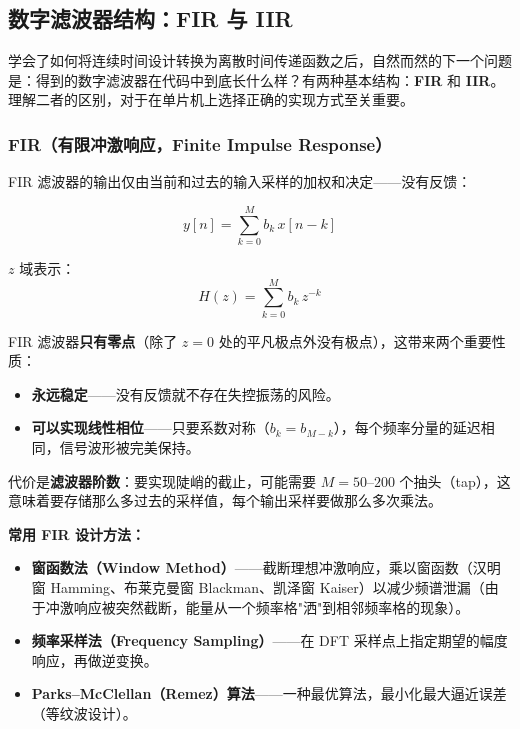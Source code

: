 \subsection{数字滤波器结构：FIR 与 IIR}

学会了如何将连续时间设计转换为离散时间传递函数之后，自然而然的下一个问题是：得到的数字滤波器在代码中到底长什么样？有两种基本结构：\textbf{FIR} 和 \textbf{IIR}。理解二者的区别，对于在单片机上选择正确的实现方式至关重要。

\subsubsection{FIR（有限冲激响应，Finite Impulse Response）}

FIR 滤波器的输出仅由当前和过去的输入采样的加权和决定——没有反馈：

\begin{equation}
y[n] = \sum_{k=0}^{M} b_k \, x[n-k]
\end{equation}

$z$ 域表示：
\begin{equation}
H(z) = \sum_{k=0}^{M} b_k \, z^{-k}
\end{equation}

FIR 滤波器\textbf{只有零点}（除了 $z = 0$ 处的平凡极点外没有极点），这带来两个重要性质：
\begin{itemize}
    \item \textbf{永远稳定}——没有反馈就不存在失控振荡的风险。
    \item \textbf{可以实现线性相位}——只要系数对称（$b_k = b_{M-k}$），每个频率分量的延迟相同，信号波形被完美保持。
\end{itemize}

代价是\textbf{滤波器阶数}：要实现陡峭的截止，可能需要 $M = 50$--$200$ 个抽头（tap），这意味着要存储那么多过去的采样值，每个输出采样要做那么多次乘法。

\textbf{常用 FIR 设计方法：}
\begin{itemize}
    \item \textbf{窗函数法（Window Method）}——截断理想冲激响应，乘以窗函数（汉明窗 Hamming、布莱克曼窗 Blackman、凯泽窗 Kaiser）以减少频谱泄漏（由于冲激响应被突然截断，能量从一个频率格"洒"到相邻频率格的现象）。
    \item \textbf{频率采样法（Frequency Sampling）}——在 DFT 采样点上指定期望的幅度响应，再做逆变换。
    \item \textbf{Parks--McClellan（Remez）算法}——一种最优算法，最小化最大逼近误差（等纹波设计）。
\end{itemize}

